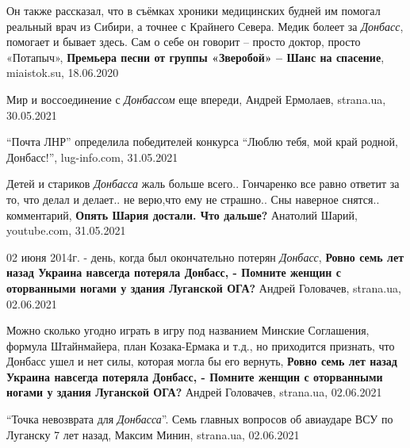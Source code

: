  
 
 
 
 

Он также рассказал, что в съёмках хроники медицинских будней им помогал
реальный врач из Сибири, а точнее с Крайнего Севера. Медик болеет за
\emph{Донбасс}, помогает и бывает здесь. Сам о себе он говорит – просто доктор,
просто «Потапыч», \textbf{Премьера песни от группы «Зверобой» – Шанс на
спасение}, miaistok.su, 18.06.2020

Мир и воссоединение с \emph{Донбассом} еще впереди, Андрей Ермолаев, strana.ua,
30.05.2021

\enquote{Почта ЛНР} определила победителей конкурса \enquote{Люблю тебя, мой
край родной, Донбасс!}, lug-info.com, 31.05.2021

Детей и стариков \emph{Донбасса} жаль больше всего.. Гончаренко все равно ответит за
то, что делал и делает.. не верю,что ему не страшно.. Сны наверное снятся..
комментарий, \textbf{Опять Шария достали. Что дальше?} Анатолий Шарий, youtube.com, 31.05.2021

02 июня 2014г. - день, когда был окончательно потерян \emph{Донбасс},
\textbf{Ровно семь лет назад Украина навсегда потеряла Донбасс, - Помните женщин с оторванными ногами у здания Луганской ОГА?} 
Андрей Головачев, strana.ua, 02.06.2021

Можно сколько угодно играть в игру под названием Минские Соглашения, формула
Штайнмайера, план Козака-Ермака и т.д., но приходится признать, что Донбасс
ушел и нет силы, которая могла бы его вернуть,
\textbf{Ровно семь лет назад Украина навсегда потеряла Донбасс, - Помните женщин с оторванными ногами у здания Луганской ОГА?} 
Андрей Головачев, strana.ua, 02.06.2021

\enquote{Точка невозврата для \emph{Донбасса}}. Семь главных вопросов об авиаударе ВСУ по Луганску 7 лет назад,
Максим Минин, strana.ua, 02.06.2021
